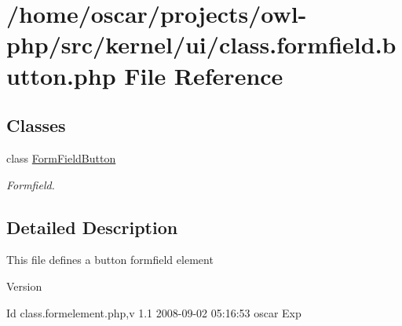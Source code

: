 \section{/home/oscar/projects/owl-\/php/src/kernel/ui/class.formfield.button.php File Reference}
\label{class_8formfield_8button_8php}
\subsection*{Classes}
\begin{DoxyCompactItemize}
\item 
class \hyperlink{classFormFieldButton}{FormFieldButton}
\begin{DoxyCompactList}\small\item\em Formfield. \item\end{DoxyCompactList}\end{DoxyCompactItemize}


\subsection{Detailed Description}
This file defines a button formfield element \begin{DoxyVersion}{Version}

\end{DoxyVersion}
\begin{DoxyParagraph}{Id}
class.formelement.php,v 1.1 2008-\/09-\/02 05:16:53 oscar Exp 
\end{DoxyParagraph}
